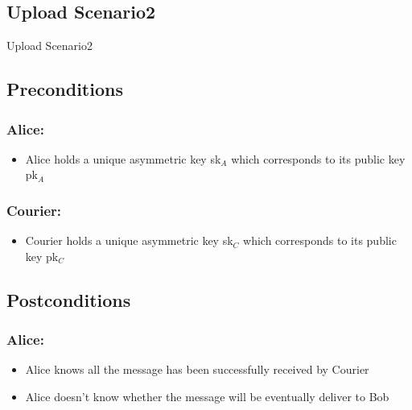 \documentclass{article}
\begin{document}
\subsection*{Upload Scenario2}
\begin{msc}{Upload Scenario2}
\setlength{\instdist}{4\instdist}
\setlength{\envinstdist}{1.7\envinstdist}
\setlength{\levelheight}{1.5\levelheight}

\nextlevel[2]
\nextlevel
{}
\nextlevel
{}
\nextlevel
{}
\nextlevel[2]
\nextlevel
{}
\nextlevel[2]
\nextlevel
\end{msc}



\subsection*{Preconditions}
\subsubsection*{Alice:}
\begin{itemize}
\item Alice holds a unique asymmetric key sk$_A$ which corresponds to its public key pk$_A$
\end{itemize}

\subsubsection*{Courier:}
\begin{itemize}
\item Courier holds a unique asymmetric key sk$_C$ which corresponds to its public key pk$_C$
\end{itemize}

\subsection*{Postconditions}
\subsubsection*{Alice:}
\begin{itemize}
\item Alice knows all the message has been successfully received by Courier
\item Alice doesn't know whether the message will be eventually deliver to Bob
\end{itemize}
\end{document}
